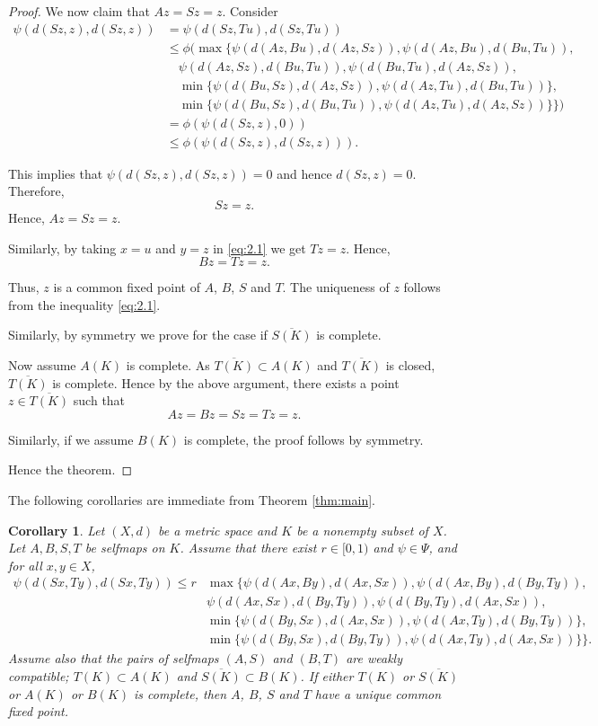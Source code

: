 \documentclass[11]{article}
\newtheorem{corollary}[definition]{Corollary}
\numberwithin{equation}{section}
\begin{document}
\begin{proof}
We now claim that $Az = Sz = z$. Consider
\begin{align*}
\psi(d(Sz,z),d(Sz,z)) &= \psi(d(Sz,Tu),d(Sz,Tu)) \\
&\leq \phi(\max\{\psi(d(Az,Bu),d(Az,Sz)), \psi(d(Az,Bu),d(Bu,Tu)), \\
&\quad \psi(d(Az,Sz),d(Bu,Tu)), \psi(d(Bu,Tu),d(Az,Sz)), \\
&\quad \min\{\psi(d(Bu,Sz),d(Az,Sz)), \psi(d(Az,Tu),d(Bu,Tu))\}, \\
&\quad \min\{\psi(d(Bu,Sz),d(Bu,Tu)), \psi(d(Az,Tu),d(Az,Sz))\}\}) \\
&= \phi(\psi(d(Sz,z),0)) \\
&\leq \phi(\psi(d(Sz,z),d(Sz,z))).
\end{align*}

This implies that $\psi(d(Sz,z),d(Sz,z)) = 0$ and hence $d(Sz,z) = 0$. Therefore,
\[
Sz = z.
\]
Hence, $Az = Sz = z$.

Similarly, by taking $x = u$ and $y = z$ in \eqref{eq:2.1} we get $Tz = z$. Hence,
\[
Bz = Tz = z.
\]

Thus, $z$ is a common fixed point of $A$, $B$, $S$ and $T$. The uniqueness of $z$ follows from the inequality \eqref{eq:2.1}.

Similarly, by symmetry we prove for the case if $\overline{S(K)}$ is complete.

Now assume $A(K)$ is complete. As $\overline{T(K)} \subset A(K)$ and $\overline{T(K)}$ is closed, $\overline{T(K)}$ is complete. Hence by the above argument, there exists a point $z \in \overline{T(K)}$ such that
\[
Az = Bz = Sz = Tz = z.
\]

Similarly, if we assume $B(K)$ is complete, the proof follows by symmetry.

Hence the theorem.
\end{proof}

The following corollaries are immediate from Theorem \ref{thm:main}.

\begin{corollary}\label{cor:2.2}
Let $(X,d)$ be a metric space and $K$ be a nonempty subset of $X$. Let $A,B,S,T$ be selfmaps on $K$. Assume that there exist $r\in[0,1)$ and $\psi\in\Psi$, and for all $x,y\in X$,
\begin{align*}
    \psi(d(Sx,Ty),d(Sx,Ty)) \leq r &\max\{\psi(d(Ax,By),d(Ax,Sx)), \psi(d(Ax,By),d(By,Ty)),\\
 &\psi(d(Ax,Sx),d(By,Ty)), \psi(d(By,Ty),d(Ax,Sx)),\\
 &\min\{\psi(d(By,Sx),d(Ax,Sx)),\psi(d(Ax,Ty),d(By,Ty))\}, \\
 &\min\{\psi(d(By,Sx),d(By,Ty)), \psi(d(Ax,Ty),d(Ax,Sx))\}\}.
\end{align*}
Assume also that the pairs of selfmaps $(A,S)$ and $(B,T)$ are weakly compatible; $T(K)\subset A(K)$ and $\overline{S(K)}\subset B(K)$. If either $T(K)$ or $\overline{S(K)}$ or $A(K)$ or $B(K)$ is complete, then $A$, $B$, $S$ and $T$ have a unique common fixed point.
\end{corollary}
\end{document}
